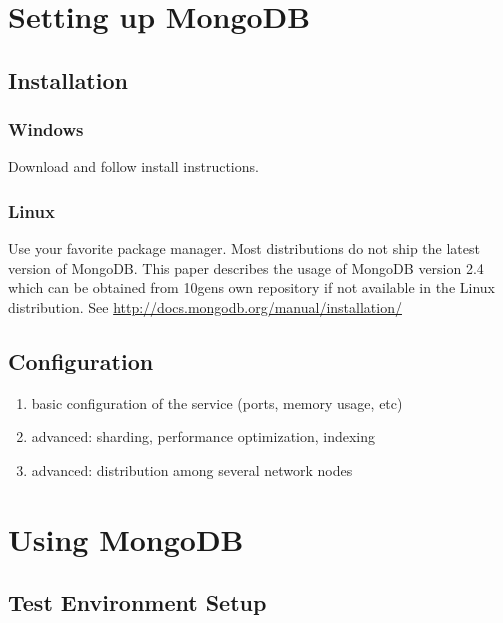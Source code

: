    

\section{Setting up MongoDB}
\label{sec:setup}

\subsection{Installation}
\label{sec:installation}

\subsubsection{Windows}
\label{sec:installation-windows}
Download and follow install instructions.

\subsubsection{Linux}
\label{sec:installation-linux}
Use your favorite package manager.
Most distributions do not ship the latest version of MongoDB. This paper describes the usage of
MongoDB version 2.4 which can be obtained from 10gens own repository if not available in the
Linux distribution. See \url{http://docs.mongodb.org/manual/installation/}

\subsection{Configuration}
\label{sec:configuration}

\begin{enumerate}
  \item basic configuration of the service (ports, memory usage, etc)
  \item advanced: sharding, performance optimization, indexing
  \item advanced: distribution among several network nodes
\end{enumerate}
    
\section{Using MongoDB}
\label{sec:usage}

\subsection{Test Environment Setup}
\label{sec:test-environment}

